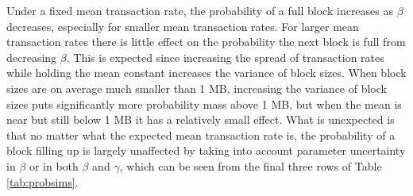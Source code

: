 \documentclass{article}
\begin{document}

Under a fixed mean transaction rate, the probability of a full block increases as $\beta$ decreases, especially for smaller mean transaction rates. For larger mean transaction rates there is little effect on the probability the next block is full from decreasing $\beta$. This is expected since increasing the spread of transaction rates while holding the mean constant increases the variance of block sizes. When block sizes are on average much smaller than 1 MB, increasing the variance of block sizes puts significantly more probability mass above 1 MB, but when the mean is near but still below 1 MB it has a relatively small effect. What is unexpected is that no matter what the expected mean transaction rate is, the probability of a block filling up is largely unaffected by taking into account parameter uncertainty in $\beta$ or in both $\beta$ and $\gamma$, which can be seen from the final three rows of Table \ref{tab:probsims}.
\end{document}
